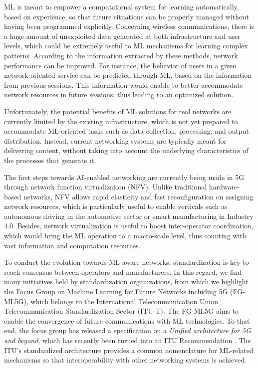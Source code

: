 \documentclass[twocolumn]{article}
\begin{document}
ML is meant to empower a computational system for learning automatically, based on experience, so that future situations can be properly managed without having been programmed explicitly. Concerning wireless communications, there is a huge amount of unexploited data generated at both infrastructure and user levels, which could be extremely useful to ML mechanisms for learning complex patterns. According to the information extracted by these methods, network performance can be improved. For instance, the behavior of users in a given network-oriented service can be predicted through ML, based on the information from previous sessions. This information would enable to better accommodate network resources in future sessions, thus leading to an optimized solution.

Unfortunately, the potential benefits of ML solutions for real networks are currently limited by the existing infrastructure, which is not yet prepared to accommodate ML-oriented tasks such as data collection, processing, and output distribution. Instead, current networking systems are typically meant for delivering content, without taking into account the underlying characteristics of the processes that generate it. 

The first steps towards AI-enabled networking are currently being made in 5G through network function virtualization (NFV). Unlike traditional hardware-based networks, NFV allows rapid elasticity and fast reconfiguration on assigning network resources, which is particularly useful to enable verticals such as autonomous driving in the automotive sector or smart manufacturing in Industry 4.0. Besides, network virtualization is useful to boost inter-operator coordination, which would bring the ML operation to a macro-scale level, thus counting with vast information and computation resources. 

To conduct the evolution towards ML-aware networks, standardization is key to reach consensus between operators and manufacturers. In this regard, we find many initiatives held by standardization organizations, from which we highlight the Focus Group on Machine Learning for Future Networks including 5G (FG-ML5G), which belongs to the International Telecommunication Union Telecommunication Standardization Sector (ITU-T). The FG-ML5G aims to enable the convergence of future communications with ML technologies. To that end, the focus group has released a specification on a \emph{Unified architecture for 5G and beyond}, which has recently been turned into an ITU Recommendation \cite{itu2019architecture}. The ITU's standardized architecture provides a common nomenclature for ML-related mechanisms so that interoperability with other networking systems is achieved. 
\end{document}
